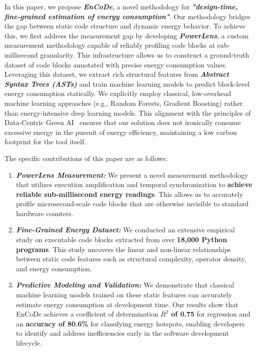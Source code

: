 In this paper, we propose \textbf{\textit{EnCoDe}}, a novel methodology for \textbf{\textit{"design-time, fine-grained estimation of energy consumption"}}. Our methodology bridges the gap between static code structure and dynamic energy behavior. To achieve this, we first address the measurement gap by developing \textbf{\textit{PowerLens}}, a custom measurement methodology capable of reliably profiling code blocks at sub-millisecond granularity. This infrastructure allows us to construct a ground-truth dataset of code blocks annotated with precise energy consumption values. Leveraging this dataset, we extract rich structural features from \textbf{\textit{Abstract Syntax Trees (ASTs)}} and train machine learning models to predict block-level energy consumption statically. We explicitly employ classical, low-overhead machine learning approaches (e.g., Random Forests, Gradient Boosting) rather than energy-intensive deep learning models. This alignment with the principles of Data-Centric Green AI~\cite{Verdecchia2022DataCentricGreenAI} ensures that our solution does not ironically consume excessive energy in the pursuit of energy efficiency, maintaining a low carbon footprint for the tool itself. 

The specific contributions of this paper are as follows:
\begin{enumerate}
    \item \textbf{\textit{PowerLens Measurement:}} We present a novel measurement methodology that utilizes execution amplification and temporal synchronization to \textbf{achieve reliable sub-millisecond energy readings}. This allows us to accurately profile microsecond-scale code blocks that are otherwise invisible to standard hardware counters.
    \item \textbf{\textit{Fine-Grained Energy Dataset:}} We conducted an extensive empirical study on executable code blocks extracted from over \textbf{18,000 Python programs}. This study uncovers the linear and non-linear relationships between static code features such as structural complexity, operator density, and energy consumption.
    \item \textbf{\textit{Predictive Modeling and Validation:}} We demonstrate that classical machine learning models trained on these static features can accurately estimate energy consumption at development time. Our results show that EnCoDe achieves a coefficient of determination \textbf{\(R^2\) of 0.75} for regression and an \textbf{accuracy of 80.6\%} for classifying energy hotspots, enabling developers to identify and address inefficiencies early in the software development lifecycle. 
\end{enumerate}


